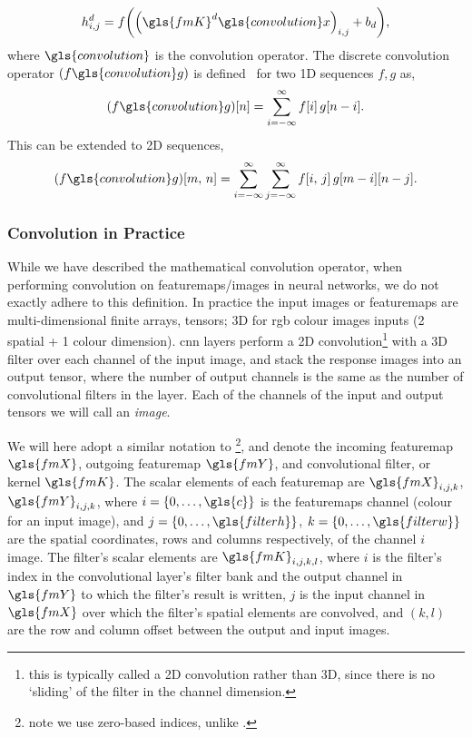 \documentclass[thesis]{subfiles}
\begin{document}
\begin{equation}
	h^d_{i,j} = f{\left( {\left(\gls{fmK}^d \gls{convolution} x \right)}_{i,j} + b_d \right)},
\end{equation}
%
where $\gls{convolution}$ is the convolution operator. The discrete convolution operator $(f \gls{convolution} g)$ is defined~\citep{damelin2011} for two 1D sequences $f, g$ as,
\begin{equation}
	(f \gls{convolution} g)[n] = \sum_{i=-\infty}^\infty f[i]\, g[n - i].
\end{equation}
%
This can be extended to 2D sequences,
\begin{equation}
(f \gls{convolution} g)[m,\,n] = \sum_{i=-\infty}^\infty \sum_{j=-\infty}^\infty f[i,\,j]\, g[m - i][n - j].
\end{equation}
%
\subsubsection{Convolution in Practice}
\label{sec:convolutioninpractice}
While we have described the mathematical convolution operator, when performing convolution on \glspl{featuremap}/images in neural networks, we do not exactly adhere to this definition. In practice the input images or \glspl{featuremap} are multi-dimensional finite arrays, \ie tensors; 3D for \gls{rgb} colour images inputs (2 spatial + 1 colour dimension). \Gls{cnn} layers perform a 2D convolution\footnote{this is typically called a 2D convolution rather than 3D, since there is no `sliding' of the filter in the channel dimension.} with a 3D filter over each channel of the input image, and stack the response images into an output tensor, where the number of output channels is the same as the number of convolutional filters in the layer. Each of the channels of the input and output tensors we will call an \emph{image}.

We will here adopt a similar notation to \citet[chapter 9]{goodfellow2016deep}\footnote{note we use zero-based indices, unlike \citeauthor{goodfellow2016deep}.}, and denote the incoming \gls{featuremap} $\gls{fmX}$, outgoing \gls{featuremap} $\gls{fmY}$, and convolutional filter, or kernel $\gls{fmK}$. The scalar elements of each \gls{featuremap} are $\gls{fmX}_{i,j,k}$, $\gls{fmY}_{i,j,k}$, where $i=\{0,\ldots,\gls{c}\}$ is the \glspl{featuremap} channel (\ie colour for an input image), and $j=\{0,\ldots,\gls{filterh}\}$, $k=\{0,\ldots,\gls{filterw}\}$ are the spatial coordinates, rows and columns respectively, of the channel $i$ image. The filter's scalar elements are $\gls{fmK}_{i,j,k,l}$, where $i$ is the filter's index in the convolutional layer's filter bank and the output channel in $\gls{fmY}$ to which the filter's result is written, $j$ is the input channel in $\gls{fmX}$ over which the filter's spatial elements are convolved, and $(k, l)$ are the row and column offset between the output and input images.
\end{document}
